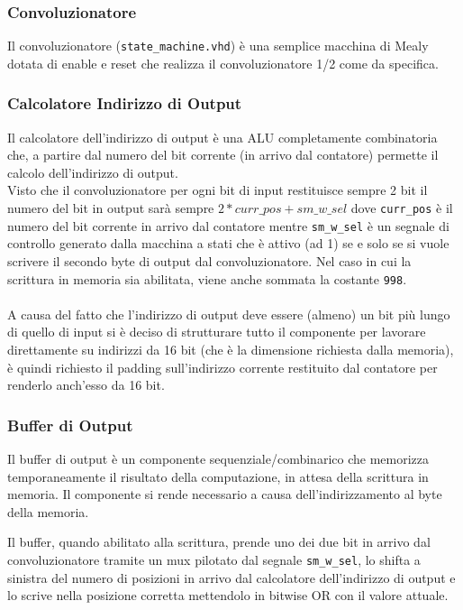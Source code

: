 \documentclass[12pt, a4paper]{article}
\begin{document}
\subsubsection{Convoluzionatore}

Il convoluzionatore (\texttt{state\_machine.vhd}) è una semplice macchina di Mealy dotata di enable e reset che
realizza il convoluzionatore 1/2 come da specifica.

\subsubsection{Calcolatore Indirizzo di Output}

Il calcolatore dell'indirizzo di output è una ALU completamente combinatoria che, a partire
dal numero del bit corrente (in arrivo dal contatore) permette il calcolo dell'indirizzo di output.
\\
\noindent Visto che il convoluzionatore per ogni bit di input restituisce sempre 2 bit il numero del bit in output
sarà sempre $2 * curr\_pos + sm\_w\_sel$ dove \texttt{curr\_pos} è il numero del bit corrente in arrivo dal
contatore mentre \texttt{sm\_w\_sel} è un segnale di controllo generato dalla macchina a stati che è attivo
(ad 1) se e solo se si vuole scrivere il secondo byte di output dal convoluzionatore.
Nel caso in cui la scrittura in memoria sia abilitata, viene anche sommata la costante \texttt{998}.
\\
\\
A causa del fatto che l'indirizzo di output deve essere (almeno) un bit più lungo di quello
di input si è deciso di strutturare tutto il componente per lavorare direttamente su indirizzi da 16 bit 
(che è la dimensione richiesta dalla memoria), è quindi richiesto il padding sull'indirizzo corrente
restituito dal contatore per renderlo anch'esso da 16 bit.


\subsubsection{Buffer di Output}

Il buffer di output è un componente sequenziale/combinarico che memorizza temporaneamente il risultato della
computazione, in attesa della scrittura in memoria. 
Il componente si rende necessario a causa dell'indirizzamento al byte della memoria.

Il buffer, quando abilitato alla scrittura, prende uno dei due bit in arrivo dal convoluzionatore tramite un mux 
pilotato dal segnale \texttt{sm\_w\_sel}, lo shifta a sinistra del numero di posizioni in arrivo
dal calcolatore dell'indirizzo di output e lo scrive nella posizione corretta 
mettendolo in bitwise OR con il valore attuale.
\end{document}
